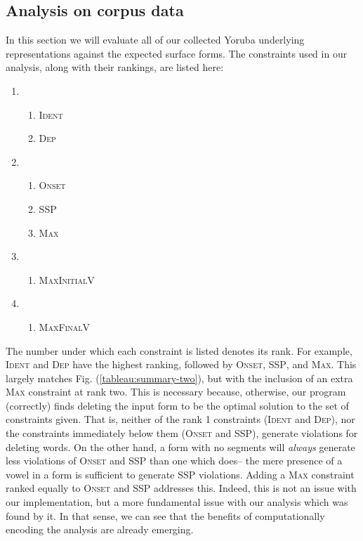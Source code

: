 \documentclass[12pt]{article}
\newcommand{\ident}{\textsc{Ident}}
\newcommand{\maxvplus}{\textsc{MaxFinalV}}
\newcommand{\maxplusv}{\textsc{MaxInitialV}}
\newcommand{\maxc}{\textsc{Max}}
\newcommand{\ssp}{\textsc{SSP}}
\newcommand{\dep}{\textsc{Dep}}
\newcommand{\onset}{\textsc{Onset}}
\newcommand{\pref}[1]{(\ref{#1})}
\begin{document}
\subsection{Analysis on corpus data}

In this section we will evaluate all of our collected Yoruba underlying
representations against the expected surface forms. The constraints
used in our analysis, along with their rankings, are listed here:

\begin{enumerate}
    \item
        \begin{enumerate}
            \item \ident{}
            \item \dep{}
        \end{enumerate}
    \item
        \begin{enumerate}
            \item \onset{}
            \item \ssp{}
            \item \maxc{}
        \end{enumerate}
    \item
        \begin{enumerate}
            \item \maxplusv{}
        \end{enumerate}
    \item
        \begin{enumerate}
            \item \maxvplus{}
        \end{enumerate}
\end{enumerate}

The number under which each constraint is listed denotes its rank.
For example, \ident{} and \dep{} have the highest ranking, followed
by \onset{}, \ssp{}, and \maxc{}. This largely matches
Fig. \pref{tableau:summary-two}, but with the inclusion of an extra
\maxc{} constraint at rank two. This is necessary because,
otherwise, our program (correctly) finds deleting the input form
to be the optimal solution to the set of constraints given. That is,
neither of the rank 1 constraints (\ident{} and \dep{}), nor the
constraints immediately below them (\onset{} and \ssp{}), generate
violations for deleting words. On the other hand, a form with no
segments will \textit{always} generate less violations of \onset{}
and \ssp{} than one which does-- the mere presence of a vowel in a
form is sufficient to generate \ssp{} violations. Adding a \maxc{}
constraint ranked equally to \onset{} and \ssp{} addresses this.
Indeed, this is not an issue with our implementation, but a more
fundamental issue with our analysis which was found by it. In that
sense, we can see that the benefits of computationally encoding the
analysis are already emerging.
\end{document}
